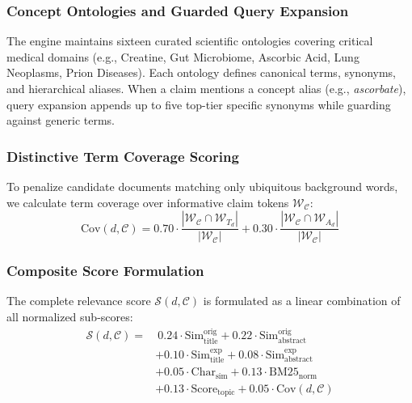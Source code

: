 \documentclass[conference]{IEEEtran}
\begin{document}
\subsubsection{Concept Ontologies and Guarded Query Expansion}
The engine maintains sixteen curated scientific ontologies covering critical medical domains (e.g., Creatine, Gut Microbiome, Ascorbic Acid, Lung Neoplasms, Prion Diseases). Each ontology defines canonical terms, synonyms, and hierarchical aliases. When a claim mentions a concept alias (e.g., \textit{ascorbate}), query expansion appends up to five top-tier specific synonyms while guarding against generic terms.

\subsubsection{Distinctive Term Coverage Scoring}
To penalize candidate documents matching only ubiquitous background words, we calculate term coverage over informative claim tokens $\mathcal{W}_{\mathcal{C}}$:
\begin{equation}
\text{Cov}(d, \mathcal{C}) = 0.70 \cdot \frac{|\mathcal{W}_{\mathcal{C}} \cap \mathcal{W}_{T_d}|}{|\mathcal{W}_{\mathcal{C}}|} + 0.30 \cdot \frac{|\mathcal{W}_{\mathcal{C}} \cap \mathcal{W}_{A_d}|}{|\mathcal{W}_{\mathcal{C}}|}
\end{equation}

\subsubsection{Composite Score Formulation}
The complete relevance score $\mathcal{S}(d, \mathcal{C})$ is formulated as a linear combination of all normalized sub-scores:
\begin{align}
\mathcal{S}(d, \mathcal{C}) = &\ 0.24 \cdot \text{Sim}_{\text{title}}^{\text{orig}} + 0.22 \cdot \text{Sim}_{\text{abstract}}^{\text{orig}} \nonumber \\
&+ 0.10 \cdot \text{Sim}_{\text{title}}^{\text{exp}} + 0.08 \cdot \text{Sim}_{\text{abstract}}^{\text{exp}} \nonumber \\
&+ 0.05 \cdot \text{Char}_{\text{sim}} + 0.13 \cdot \text{BM25}_{\text{norm}} \nonumber \\
&+ 0.13 \cdot \text{Score}_{\text{topic}} + 0.05 \cdot \text{Cov}(d, \mathcal{C})
\label{eq:composite}
\end{align}
\end{document}
